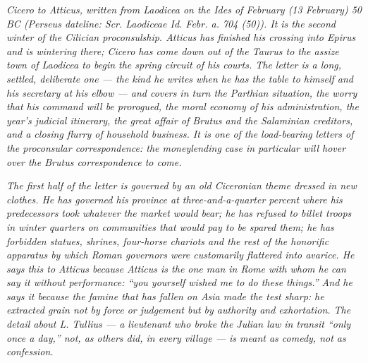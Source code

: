 
\textit{Cicero to Atticus, written from Laodicea on the
Ides of February (13 February) 50 BC (Perseus dateline:
\textit{Scr. Laodiceae Id. Febr. a. 704 (50)}). It is
the second winter of the Cilician proconsulship.
Atticus has finished his crossing into Epirus and is
wintering there; Cicero has come down out of the Taurus
to the assize town of Laodicea to begin the spring
circuit of his courts. The letter is a long, settled,
deliberate one --- the kind he writes when he has the
table to himself and his secretary at his elbow --- and
covers in turn the Parthian situation, the worry that
his command will be prorogued, the moral economy of his
administration, the year's judicial itinerary, the
great affair of Brutus and the Salaminian creditors,
and a closing flurry of household business. It is one
of the load-bearing letters of the proconsular
correspondence: the moneylending case in particular
will hover over the Brutus correspondence to come.}

\textit{The first half of the letter is governed by an
old Ciceronian theme dressed in new clothes. He has
governed his province at three-and-a-quarter percent
where his predecessors took whatever the market would
bear; he has refused to billet troops in winter quarters
on communities that would pay to be spared them; he has
forbidden statues, shrines, four-horse chariots and the
rest of the honorific apparatus by which Roman governors
were customarily flattered into avarice. He says this to
Atticus because Atticus is the one man in Rome with
whom he can say it without performance: ``you yourself
wished me to do these things.'' And he says it because
the famine that has fallen on Asia made the test sharp:
he extracted grain not by force or judgement but by
authority and exhortation. The detail about L. Tullius
--- a lieutenant who broke the Julian law in transit
``only once a day,'' not, as others did, in every
village --- is meant as comedy, not as confession.}

